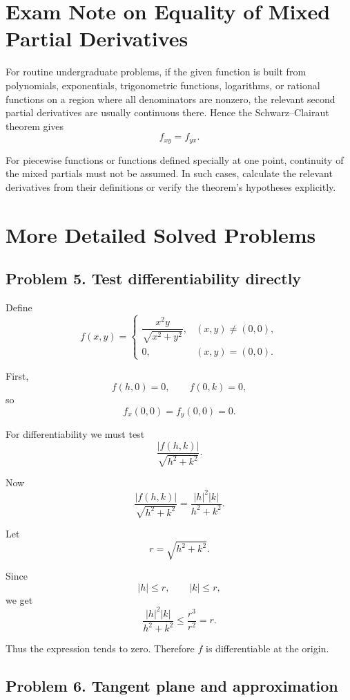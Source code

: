 \documentclass[11pt,oneside]{book}
\theoremstyle{studentthm}
\theoremstyle{definition}
\begin{document}
\section{Exam Note on Equality of Mixed Partial Derivatives}

For routine undergraduate problems, if the given function is built from polynomials, exponentials, trigonometric functions, logarithms, or rational functions on a region where all denominators are nonzero, the relevant second partial derivatives are usually continuous there. Hence the Schwarz--Clairaut theorem gives
\[
f_{xy}=f_{yx}.
\]

For piecewise functions or functions defined specially at one point, continuity of the mixed partials must not be assumed. In such cases, calculate the relevant derivatives from their definitions or verify the theorem's hypotheses explicitly.

\section{More Detailed Solved Problems}

\subsection*{Problem 5. Test differentiability directly}

Define
\[
f(x,y)
=
\begin{cases}
\dfrac{x^2y}{\sqrt{x^2+y^2}},&(x,y)\ne(0,0),\\
0,&(x,y)=(0,0).
\end{cases}
\]

First,
\[
f(h,0)=0,\qquad f(0,k)=0,
\]
so
\[
f_x(0,0)=f_y(0,0)=0.
\]

For differentiability we must test
\[
\frac{|f(h,k)|}{\sqrt{h^2+k^2}}.
\]

Now
\[
\frac{|f(h,k)|}{\sqrt{h^2+k^2}}
=
\frac{|h|^2|k|}{h^2+k^2}.
\]

Let
\[
r=\sqrt{h^2+k^2}.
\]

Since
\[
|h|\le r,\qquad |k|\le r,
\]
we get
\[
\frac{|h|^2|k|}{h^2+k^2}
\le
\frac{r^3}{r^2}
=
r.
\]

Thus the expression tends to zero. Therefore \(f\) is differentiable
at the origin.

\subsection*{Problem 6. Tangent plane and approximation}
\end{document}
